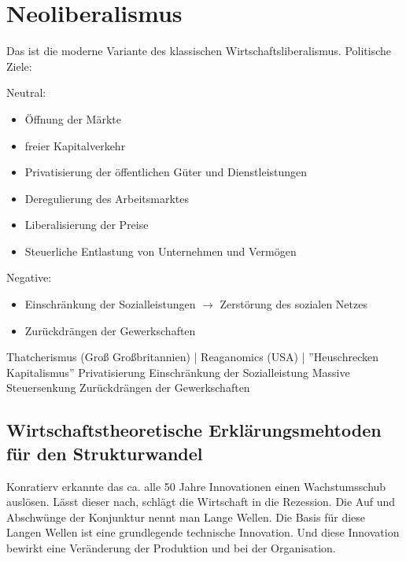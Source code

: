 \documentclass[a4paper]{report}
\begin{document}
\chapter{Neoliberalismus}
Das ist die moderne Variante des klassischen Wirtschaftsliberalismus.
\newline
Politische Ziele:

Neutral:

\begin{itemize}
\item Öffnung der Märkte 
\item freier Kapitalverkehr
\item Privatisierung der öffentlichen Güter und Dienstleistungen
\item Deregulierung des Arbeitsmarktes
\item Liberalisierung der Preise
\item Steuerliche Entlastung von Unternehmen und Vermögen
\end{itemize}

Negative:

\begin{itemize}
\item Einschränkung der Sozialleistungen $\rightarrow$ Zerstörung des sozialen Netzes
\item Zurückdrängen der Gewerkschaften
\end{itemize}

Thatcherismus (Groß Großbritannien) | Reaganomics (USA) | ''Heuschrecken Kapitalismus''
\newline
\newline
Privatisierung
Einschränkung der Sozialleistung
Massive Steuersenkung
Zurückdrängen der Gewerkschaften

\section{Wirtschaftstheoretische Erklärungsmehtoden für den Strukturwandel}

Konratierv erkannte das ca. alle 50 Jahre Innovationen einen Wachstumsschub auslösen. Lässt dieser nach, schlägt die Wirtschaft in die Rezession. Die Auf und Abschwünge der Konjunktur nennt man Lange Wellen. Die Basis für diese Langen Wellen ist eine grundlegende technische Innovation. Und diese Innovation bewirkt eine Veränderung der Produktion und bei der Organisation.
\end{document}
